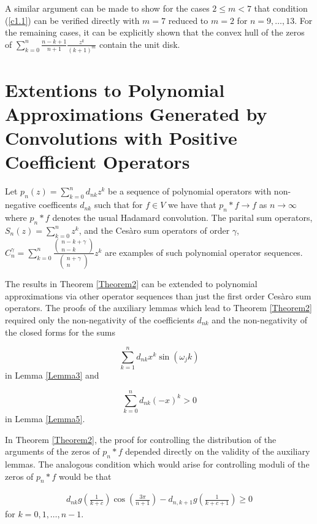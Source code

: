 \documentclass[final]{siamltex}
\begin{document}
A similar argument can be made to show for the cases $2 \leq m < 7$ that condition (\ref{c1.1})  can be verified directly with $m=7$ reduced to $m=2$ for $n = 9, \ldots, 13.$   For the remaining cases, it can be explicitly shown that the convex hull of the zeros of  $\sum_{k=0}^{n} \frac{n-k+1}{n+1} \frac{z^{k}}{(k+1)^{m}}$ contain the unit disk.

\section{Extentions to Polynomial Approximations Generated by Convolutions with Positive Coefficient Operators}

Let $p_{n}(z) =\sum_{k=0}^{n} d_{nk} z^{k}$ be a sequence of polynomial operators with non-negative coefficents $d_{nk}$ such that for $f \in V$ we have that $p_{n} * f \rightarrow f$ as $n \rightarrow \infty$ where $p_{n} * f$ denotes the usual Hadamard convolution.  The parital sum operators, $S_{n}(z) = \sum_{k=0}^{n} z^{k}$, and the Ces\`{a}ro sum operators of order $\gamma$, $C_{n}^{\gamma} = \sum_{k=0}^{n} \frac{ \left( \begin{array}{c} n - k + \gamma \\ n - k \end{array} \right) } { \left( \begin{array}{c} n + \gamma \\ n \end{array} \right) } z^{k}$ are examples of such polynomial operator sequences.  

The results in Theorem \ref{Theorem2} can be extended to polynomial approximations via other operator sequences than just the first order Ces\`{a}ro sum operators.   The proofs of the auxiliary lemmas which lead to Theorem \ref{Theorem2} required only the non-negativity of the coefficients $d_{nk}$  and the non-negativity of the closed forms for the sums 

$$\sum_{k=1}^{n} d_{nk} x^{k} \sin( \omega_{j} k)$$
in Lemma \ref{Lemma3} and 

$$\sum_{k=0}^{n} d_{nk} {(-x)}^{k} > 0$$
 in Lemma \ref{Lemma5}.  

In Theorem \ref{Theorem2}, the proof for controlling the distribution of the arguments of the zeros of $p_n * f$ depended directly on the validity of the auxiliary lemmas.  The analogous condition which would arise for controlling moduli of the zeros of $p_n * f$ would be that

  \begin{eqnarray*}
d_{nk}g \left( \frac{1}{k+c} \right) \cos \left( \frac{3 \pi}{n+1} \right) - d_{n,k+1}g \left( \frac{1}{k+c+1} \right) \geq 0 
  \end{eqnarray*}
  for $ k = 0, 1, \ldots, n-1.$ 
\end{document}
